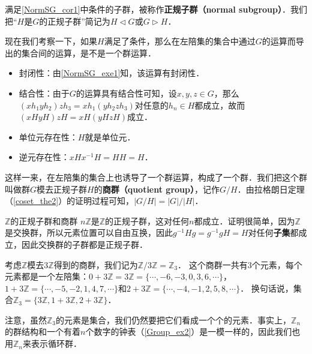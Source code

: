 满足\autoref{NormSG_cor1}中条件的子群，被称作\textbf{正规子群（normal subgroup）}．我们把“$H$是$G$的正规子群”简记为$H\triangleleft G$或$G\triangleright H$．

现在我们考察一下，如果$H$满足了条件，那么在左陪集的集合中通过$G$的运算而导出的集合间的运算，是不是一个群运算．
\begin{itemize}
\item 封闭性：由\autoref{NormSG_exe1}知，该运算有封闭性．
\item 结合性：由于$G$的运算具有结合性可知，设$x, y, z\in G$，那么$(xh_1yh_2)zh_3=xh_1(yh_2zh_3)$对任意的$h_n\in H$都成立，故而$(xHyH)zH=xH(yHzH)$成立．
\item 单位元存在性：$H$就是单位元．
\item 逆元存在性：$xHx^{-1}H=HH=H$．
\end{itemize}

这样一来，在左陪集的集合上也诱导了一个群运算，构成了一个群．我们把这个群叫做群$G$模去正规子群$H$的\textbf{商群（quotient group）}，记作$G/H$．由拉格朗日定理（\autoref{coset_the2}）的证明过程可知，$|G/H|={|G|}/{|H|}$．

\begin{example}{$\mathbb{Z}$的正规子群和商群}\label{NormSG_ex4}
$n\mathbb{Z}$是$\mathbb{Z}$的正规子群，这对任何$n$都成立．证明很简单，因为$\mathbb{Z}$是交换群，所以元素位置可以自由互换，因此$g^{-1}Hg=g^{-1}gH=H$对任何\textbf{子集}都成立，因此交换群的子群都是正规子群．

考虑$\mathbb{Z}$模去$3\mathbb{Z}$得到的商群，我们记为$\mathbb{Z}/3\mathbb{Z}=\mathbb{Z}_3$． 这个商群一共有$3$个元素，每个元素都是一个左陪集：$0+3\mathbb{Z}=3\mathbb{Z}=\{\cdots, -6, -3, 0, 3, 6, \cdots\}$，$1+3\mathbb{Z}=\{\cdots, -5, -2, 1, 4, 7, \cdots\}$和$2+3\mathbb{Z}=\{\cdots, -4, -1, 2, 5, 8, \cdots\}$． 换句话说，集合$\mathbb{Z}_3=\{3\mathbb{Z}, 1+3\mathbb{Z}, 2+3\mathbb{Z}\}$．

注意，虽然$\mathbb{Z}_3$的元素是集合，我们仍然要把它们看成一个个的元素．事实上，$\mathbb{Z}_n$的群结构和一个有着$n$个数字的钟表（\autoref{Group_ex2}）是一模一样的，因此我们也用$\mathbb{Z}_n$来表示循环群． 
\end{example}

